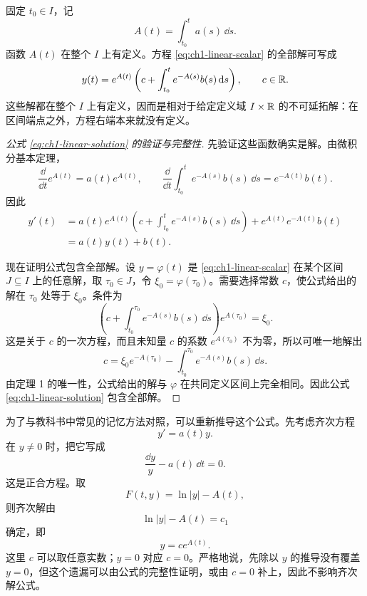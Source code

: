 固定 \(t_0\in I\)，记
\begin{equation}
 A(t)=\int_{t_0}^{t}a(s)\,\dd s.
 \label{eq:ch1-linear-integrated-coefficient}
\end{equation}
函数 \(A(t)\) 在整个 \(I\) 上有定义。方程 \eqref{eq:ch1-linear-scalar} 的全部解可写成
\begin{equation}
 y(t)=e^{A(t)}
 \left(
  c+\int_{t_0}^{t}e^{-A(s)}b(s)\,\mathrm d s
 \right),
 \qquad c\in\mathbb R.
 \label{eq:ch1-linear-solution}
\end{equation}
这些解都在整个 \(I\) 上有定义，因而是相对于给定定义域 \(I\times\mathbb R\) 的不可延拓解：在区间端点之外，方程右端本来就没有定义。

\begin{proof}[公式 \eqref{eq:ch1-linear-solution} 的验证与完整性]
先验证这些函数确实是解。由微积分基本定理，
\[
 \frac{\dd}{\dd t}e^{A(t)}=a(t)e^{A(t)},
 \qquad
 \frac{\dd}{\dd t}\int_{t_0}^{t}e^{-A(s)}b(s)\,\dd s
 =e^{-A(t)}b(t).
\]
因此
\[
 \begin{aligned}
  y'(t)
  &=a(t)e^{A(t)}
    \left(c+\int_{t_0}^{t}e^{-A(s)}b(s)\,\dd s\right)
    +e^{A(t)}e^{-A(t)}b(t)\\
  &=a(t)y(t)+b(t).
 \end{aligned}
\]

现在证明公式包含全部解。设 \(y=\varphi(t)\) 是 \eqref{eq:ch1-linear-scalar} 在某个区间 \(J\subseteq I\) 上的任意解，取 \(\tau_0\in J\)，令 \(\xi_0=\varphi(\tau_0)\)。需要选择常数 \(c\)，使公式给出的解在 \(\tau_0\) 处等于 \(\xi_0\)。条件为
\[
 \left(
  c+\int_{t_0}^{\tau_0}e^{-A(s)}b(s)\,\dd s
 \right)e^{A(\tau_0)}
 =\xi_0.
\]
这是关于 \(c\) 的一次方程，而且未知量 \(c\) 的系数 \(e^{A(\tau_0)}\) 不为零，所以可唯一地解出
\[
 c=\xi_0e^{-A(\tau_0)}
 -\int_{t_0}^{\tau_0}e^{-A(s)}b(s)\,\dd s.
\]
由定理 1 的唯一性，公式给出的解与 \(\varphi\) 在共同定义区间上完全相同。因此公式 \eqref{eq:ch1-linear-solution} 包含全部解。
\end{proof}

为了与教科书中常见的记忆方法对照，可以重新推导这个公式。先考虑齐次方程
\begin{equation}
 y'=a(t)y.
 \label{eq:ch1-linear-homogeneous}
\end{equation}
在 \(y\neq0\) 时，把它写成
\[
 \frac{\dd y}{y}-a(t)\,\dd t=0.
\]
这是正合方程。取
\[
 F(t,y)=\ln|y|-A(t),
\]
则齐次解由
\[
 \ln|y|-A(t)=c_1
\]
确定，即
\begin{equation}
 y=ce^{A(t)}.
 \label{eq:ch1-linear-homogeneous-solution}
\end{equation}
这里 \(c\) 可以取任意实数；\(y=0\) 对应 \(c=0\)。严格地说，先除以 \(y\) 的推导没有覆盖 \(y=0\)，但这个遗漏可以由公式的完整性证明，或由 \(c=0\) 补上，因此不影响齐次解公式。

